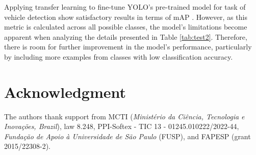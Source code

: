 \documentclass[10pt,conference]{IEEEtran}
\begin{document}
Applying transfer learning to fine-tune YOLO's pre-trained model for task of vehicle detection show satisfactory results in terms of mAP . However, as this metric is calculated across all possible classes, the model's limitations become apparent when analyzing the details presented in Table \ref{tab:test2}. Therefore, there is room for further improvement in the model's performance, particularly by including more examples from classes with low classification accuracy.





\section*{Acknowledgment}

The authors thank support from MCTI (\textit{Ministério da Ciência, Tecnologia e Inovações, Brazil}), law 8.248, PPI-Softex - TIC 13 - 01245.010222/2022-44, \textit{Fundação de Apoio à Universidade de São Paulo} (FUSP), and FAPESP (grant 2015/22308-2).






\end{document}
